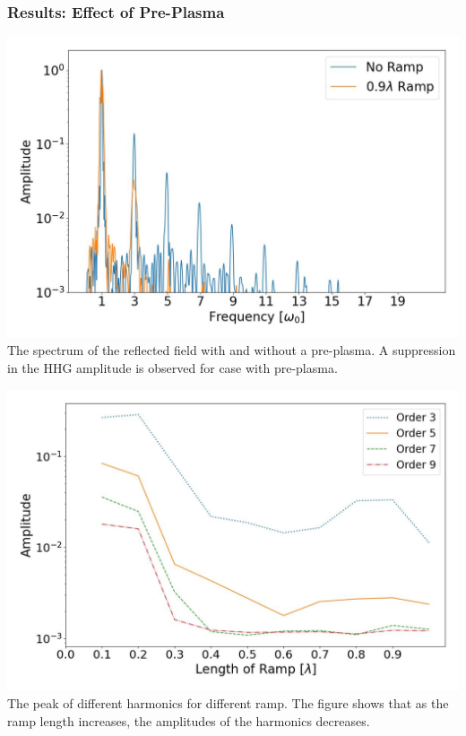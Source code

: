 \documentclass{beamer}
\begin{document}
\begin{frame}
    \frametitle{Results: Effect of  Pre-Plasma}
    \begin{minipage}[h]{0.48\linewidth}
        \centering
        \includegraphics[width=1\textwidth, height=0.55\textheight]{images/ramp.jpg}
        \scriptsize{The spectrum of the reflected field with and without a pre-plasma. A suppression in the HHG amplitude is observed for case with pre-plasma.}
        \label{fig:ramp}
    \end{minipage}
    \begin{minipage}[h]{0.48\linewidth}
        \centering
        \includegraphics[width=1\textwidth, height=0.55\textheight]{images/ramp_7600.jpg}
        \scriptsize{The peak of different harmonics for different ramp. The figure shows that as the ramp length increases, the amplitudes of the harmonics decreases.}
        \label{fig:ramp-peaks}
    \end{minipage}
\end{frame}
\end{document}
